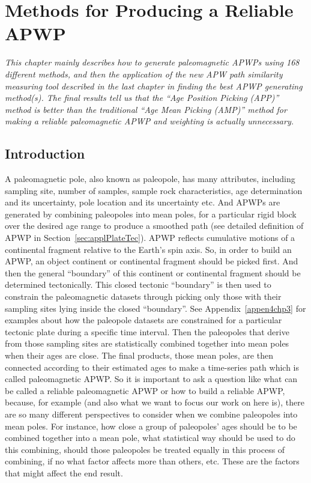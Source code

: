 \chapter{Methods for Producing a Reliable APWP}\label{chap:Reliab}  %
\textit{This chapter mainly describes how to generate paleomagnetic APWPs using
168 different methods, and then the application of the new APW path similarity
measuring tool described in the last chapter in finding the best APWP generating
method(s). The final results tell us that the ``Age Position Picking (APP)''  %
method is better than the traditional ``Age Mean Picking (AMP)'' method for
making a reliable paleomagnetic APWP and weighting is actually unnecessary.}
\vfill
\minitoc\newpage

\section{Introduction}

A paleomagnetic pole, also known as paleopole, has many attributes, including
sampling site, number of samples, sample rock characteristics, age determination
and its uncertainty, pole location and its uncertainty etc. And APWPs are
generated by combining paleopoles into mean poles, for a particular rigid block
over the desired age range to produce a smoothed path (see detailed definition
of APWP in Section~\ref{sec:applPlateTec}). APWP reflects cumulative motions of
a continental fragment relative to the Earth's spin axis. So, in order to build
an APWP, an object continent or continental fragment should be picked first. And
then the general ``boundary'' of this continent or continental fragment should
be determined tectonically. This closed tectonic ``boundary'' is then used to
constrain the paleomagnetic datasets through picking only those with their
sampling sites lying inside the closed ``boundary''. See
Appendix~\ref{appen4chp3} for examples about how the paleopole datasets are
constrained for a particular tectonic plate during a specific time interval.
Then the paleopoles that derive from those sampling sites are statistically
combined together into mean poles when their ages are close. The final products,
those mean poles, are then connected according to their estimated ages to make a
time-series path which is called paleomagnetic APWP\@. So it is important to ask
a question like what can be called a reliable paleomagnetic APWP or how to build
a reliable APWP, because, for example (and also what we want to focus our work
on here is), there are so many different perspectives to consider when we
combine paleopoles into mean poles. For instance, how close a group of
paleopoles' ages should be to be combined together into a mean pole, what
statistical way should be used to do this combining, should those paleopoles be
treated equally in this process of combining, if no what factor affects more
than others, etc. These are the factors that might affect the end result.


